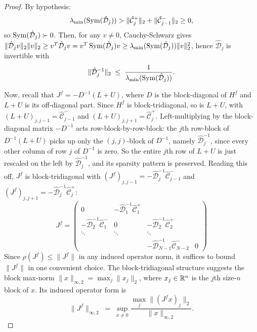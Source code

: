 \begin{proof}
	By hypothesis:
	\begin{align*}
		\lambda_{\min}(\operatorname{Sym}(\hat{\mathcal{D}}_j)) 
        > \|\hat{\mathcal{C}}^+_j\|_2 + \|\hat{\mathcal{C}}^-_{j-1}\|_2
		  \geq 0,
	\end{align*}
	so $\operatorname{Sym}(\hat{\mathcal{D}}_j) \succ 0$. Then, for any $v \neq 0$, Cauchy-Schwarz gives $\|\hat{\mathcal{D}}_j v\|_2 \|v\|_2 \geq v^T \hat{\mathcal{D}}_j v = v^T \operatorname{Sym}(\hat{\mathcal{D}}_j) v \geq \lambda_{\min}(\operatorname{Sym}(\hat{\mathcal{D}}_j)) \|v\|_2^2$, hence $\hat{\mathcal{D}}_j$ is invertible with
	\begin{equation}
		\|\hat{\mathcal{D}}_j^{-1}\|_2 \;\leq\; \frac{1}{\lambda_{\min}(\operatorname{Sym}(\hat{\mathcal{D}}_j))}.
		\label{eq:diag-block-inv-bound}
	\end{equation}

	Now, recall that $J^f = -D^{-1}(L+U)$, where $D$ is the block-diagonal of $H^f$ and $L+U$ is its off-diagonal part. Since $H^f$ is block-tridiagonal, so is $L+U$, with $(L+U)_{j,j-1} = \hat{\mathcal{C}}^-_{j-1}$ and $(L+U)_{j,j+1} = \hat{\mathcal{C}}^+_j$. Left-multiplying by the block-diagonal matrix $-D^{-1}$ acts row-block-by-row-block: the $j$th row-block of $D^{-1}(L+U)$ picks up only the $(j,j)$-block of $D^{-1}$, namely $\hat{\mathcal{D}}_j^{-1}$, since every other column of row $j$ of $D^{-1}$ is zero. So the entire $j$th row of $L+U$ is just rescaled on the left by $\hat{\mathcal{D}}_j^{-1}$, and its sparsity pattern is preserved. Reading this off, $J^f$ is block-tridiagonal with $(J^f)_{j,j-1} = -\hat{\mathcal{D}}_j^{-1}\hat{\mathcal{C}}^-_{j-1}$ and $(J^f)_{j,j+1} = -\hat{\mathcal{D}}_j^{-1}\hat{\mathcal{C}}^+_j$:
	\[
		J^f = \begin{pmatrix}
			0                                              & -\hat{\mathcal{D}}_1^{-1}\hat{\mathcal{C}}^+_1 &                                                        &   \\
			-\hat{\mathcal{D}}_2^{-1}\hat{\mathcal{C}}^-_1 & 0                                              & -\hat{\mathcal{D}}_2^{-1}\hat{\mathcal{C}}^+_2         &   \\
			\ddots                                         & \ddots                                         & \ddots                                                     \\
			                                               &                                                & -\hat{\mathcal{D}}_{N-1}^{-1}\hat{\mathcal{C}}^-_{N-2} & 0
		\end{pmatrix}
	\]
	Since $\rho(J^f) \leq \|J^f\|$ in any induced operator norm, it suffices to bound $\|J^f\|$ in one convenient choice. The block-tridiagonal structure suggests the block max-norm $\|x\|_{\infty,2} = \max_j \|x_j\|_2$, where $x_j \in {\mathbb{R}}^n$ is the $j$th size-$n$ block of $x$. Its induced operator form is
	\[
		\|J^f\|_{\infty,2} \;=\; \sup_{x \neq 0} \frac{\max_j \|(J^f x)_j\|_2}{\|x\|_{\infty,2}}.
	\]


\end{proof}
